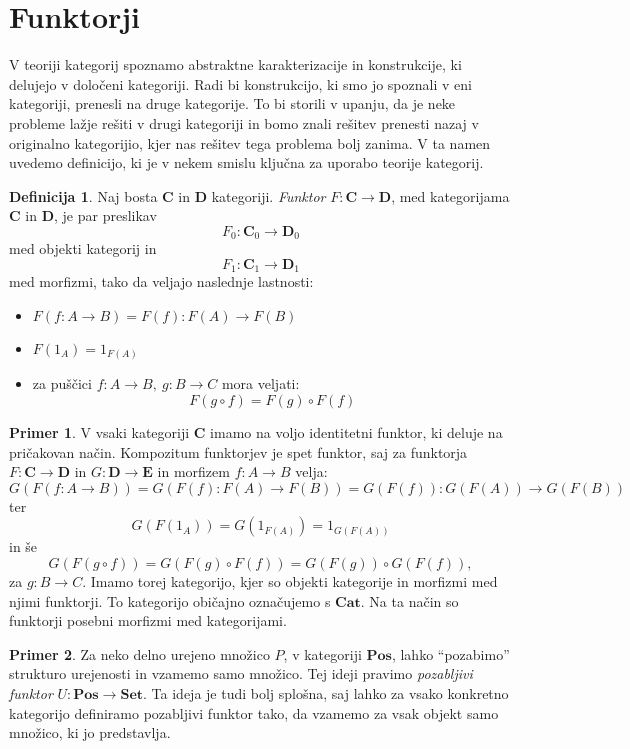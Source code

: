 \documentclass[12pt,a4paper]{book}
\theoremstyle{definition}
\newtheorem{definicija}{Definicija}[chapter]
\theoremstyle{plain}
\theoremstyle{definition}
\newtheorem{primer}{Primer}[section]
\theoremstyle{remark}
\newcommand{\cat}[1]{\textbf{#1}}
\begin{document}
\section{Funktorji}

V teoriji kategorij spoznamo abstraktne karakterizacije in konstrukcije, ki delujejo v določeni kategoriji. Radi bi konstrukcijo, ki smo jo spoznali v eni kategoriji, prenesli na druge kategorije. To bi storili v upanju, da je neke probleme lažje rešiti v drugi kategoriji in bomo znali rešitev prenesti nazaj v originalno kategorijio, kjer nas rešitev tega problema bolj zanima. V ta namen uvedemo definicijo, ki je v nekem smislu ključna za uporabo teorije kategorij.

\begin{definicija}
Naj bosta $\cat{C}$ in $\cat{D}$ kategoriji. \emph{Funktor} $F : \cat{C} \to \cat{D}$, med kategorijama $\cat{C}$ in $\cat{D}$, je par preslikav
$$F_0 : \cat{C}_0 \to \cat{D}_0$$
med objekti kategorij in
$$F_1 : \cat{C}_1 \to \cat{D}_1$$
med morfizmi, tako da veljajo naslednje lastnosti:
\begin{itemize}
\item $F(f : A \to B) = F(f) : F(A) \to F(B)$
\item $F(1_A) = 1_{F(A)}$
\item za puščici $f : A \to B, \ g : B \to C$ mora veljati:
$$F(g \circ f) = F(g) \circ F(f)$$
\end{itemize}
\end{definicija}

\begin{primer}
V vsaki kategoriji $\cat{C}$ imamo na voljo identitetni funktor, ki deluje na pričakovan način. Kompozitum funktorjev je spet funktor, saj za funktorja $F : \cat{C} \to \cat{D}$ in $G : \cat{D} \to \cat{E}$ in morfizem $f : A \to B$ velja:
$$G(F(f : A \to B)) = G(F(f) : F(A) \to F(B)) = G(F(f)) : G(F(A)) \to G(F(B))$$
ter
$$G(F(1_A)) = G(1_{F(A)}) = 1_{G(F(A))}$$
in še
$$G(F(g \circ f)) = G(F(g) \circ F(f)) = G(F(g)) \circ G(F(f)),$$
za $g : B \to C$. Imamo torej kategorijo, kjer so objekti kategorije in morfizmi med njimi funktorji. To kategorijo običajno označujemo s $\cat{Cat}$. Na ta način so funktorji posebni morfizmi med kategorijami.
\end{primer}

\begin{primer}
Za neko delno urejeno množico $P$, v kategoriji $\cat{Pos}$, lahko "`pozabimo"' strukturo urejenosti in vzamemo samo množico. Tej ideji pravimo \emph{pozabljivi funktor} $U : \cat{Pos} \to \cat{Set}$. Ta ideja je tudi bolj splošna, saj lahko za vsako konkretno kategorijo definiramo pozabljivi funktor tako, da vzamemo za vsak objekt samo množico, ki jo predstavlja.
\end{primer}
\end{document}
